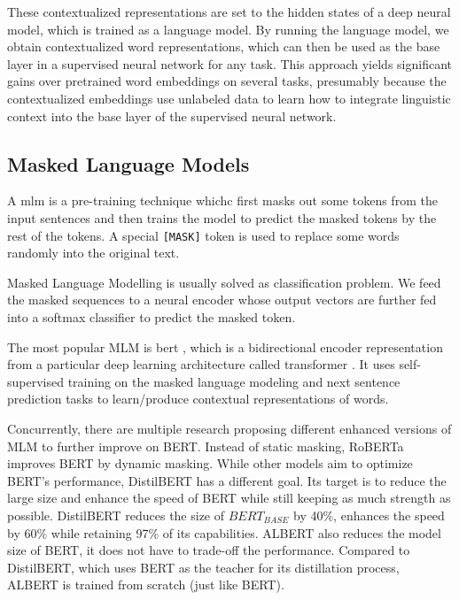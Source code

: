 These contextualized representations are set to the hidden states of a deep neural model, which is trained as a language model.
By running the language model, we obtain contextualized word representations, which can then be used as the base layer in a supervised neural network for any task. This approach yields significant gains over pretrained word embeddings on several tasks, presumably because the contextualized embeddings use unlabeled data to learn how to integrate linguistic context into the base layer of the supervised neural network.



\subsection{Masked Language Models}\label{subsec:masked-language-models}
A \acrfull{mlm} is a pre-training technique whichc first masks out some tokens from the
input sentences and then trains the model to predict the masked
tokens by the rest of the tokens. A special \texttt{[MASK]} token is used to replace some words randomly into the original text.

Masked Language Modelling is usually solved as classification problem. We feed the masked
sequences to a neural encoder whose output vectors are further fed into a softmax classifier to predict the masked token.

The most popular MLM is \acrshort{bert} \cite{devlin2018bert}, which is a bidirectional encoder representation from a particular deep learning architecture called \gls{transformer} \cite{vaswani2017attention}. 
It uses self-supervised training on the masked language modeling and next sentence prediction tasks to learn/produce contextual representations of words.

Concurrently, there are multiple research proposing different enhanced versions of MLM to further improve on BERT. Instead
of static masking, RoBERTa \cite{liu2019roberta} improves BERT by dynamic masking.
While other models aim to optimize BERT's performance, DistilBERT has a different goal. Its target is to reduce the large size and enhance the speed of BERT while still keeping as much strength as possible.
DistilBERT \cite{sanh2019distilbert} reduces the size of $BERT_{BASE}$ by 40\%, enhances the speed by 60\% while retaining 97\% of its capabilities.
ALBERT \cite{lan2019albert} also reduces the model size of BERT, it does not have to trade-off the performance. Compared to DistilBERT, which uses BERT as the teacher for its distillation process, ALBERT is trained from scratch (just like BERT).

